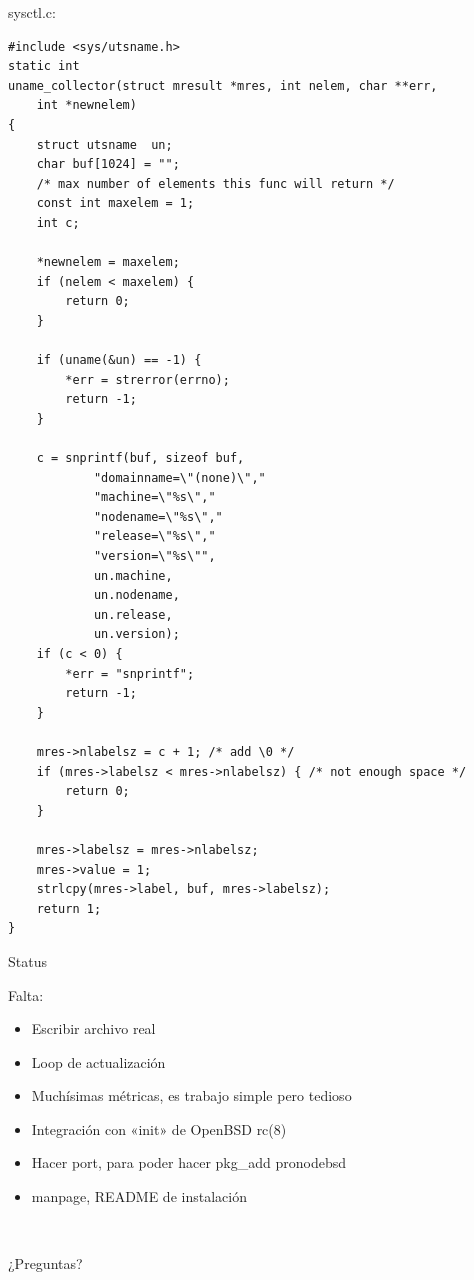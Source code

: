 \documentclass[11pt,spanish]{article}
\newcommand{\rowsp}[1][1em]{\vspace{#1}}
\newcommand{\hone}[1]{{\rowsp[0.3em]\noindent\Large #1 \rowsp[0.3em]}}
\newcommand{\displaypage}[1]{%
\
\vspace{\stretch{1}}
\begin{center}
\hone{#1}
\end{center}
\vspace{\stretch{1}}
}
\newcommand{\myitm}[1]{\begin{itemize}#1\end{itemize}}
\begin{document}
sysctl.c:
\begin{lstlisting}
#include <sys/utsname.h>
static int
uname_collector(struct mresult *mres, int nelem, char **err,
	int *newnelem)
{
	struct utsname	un;
	char buf[1024] = "";
	/* max number of elements this func will return */
	const int maxelem = 1;
	int c;

	*newnelem = maxelem;
	if (nelem < maxelem) {
		return 0;
	}

	if (uname(&un) == -1) {
		*err = strerror(errno);
		return -1;
	}

	c = snprintf(buf, sizeof buf,
			"domainname=\"(none)\","
			"machine=\"%s\","
			"nodename=\"%s\","
			"release=\"%s\","
			"version=\"%s\"",
			un.machine,
			un.nodename,
			un.release,
			un.version);
	if (c < 0) {
		*err = "snprintf";
		return -1;
	}

	mres->nlabelsz = c + 1; /* add \0 */
	if (mres->labelsz < mres->nlabelsz) { /* not enough space */
		return 0;
	}

	mres->labelsz = mres->nlabelsz;
	mres->value = 1;
	strlcpy(mres->label, buf, mres->labelsz);
	return 1;
}
\end{lstlisting}



\newpage %
\hone{Status}

Falta:
\myitm{
\item Escribir archivo real
\item Loop de actualización
\item Muchísimas métricas, es trabajo simple pero tedioso
\item Integración con «init» de OpenBSD rc(8)
\item Hacer port, para poder hacer pkg\_add pronodebsd
\item manpage, README de instalación
}

\newpage %
\displaypage{¿Preguntas?}

\label{lastpage}
\end{document}
